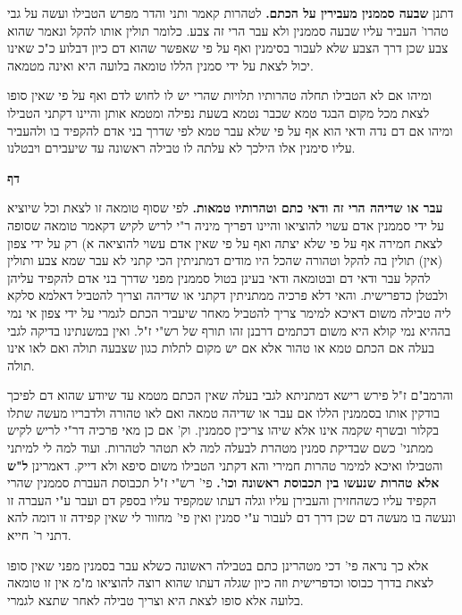 \documentclass[12pt, openany]{book}
\newcommand{\sethebfont}{
\fontsize{10.5pt}{21.0pt} \selectfont
}
\newcommand{\twocol}[1]{
	{\sethebfont \begin{multicols}{2}
			#1
	\end{multicols}}	
}
\newcommand{\textblock}[1]{
{\sethebfont #1\\}	
}
\newcommand{\chapname}{}
\newcommand{\newchap}[1]{
	\addcontentsline{toc}{chapter}{#1}
	\renewcommand{\chapname}{#1}
		\begin{center}
			\textbf{%
\fontsize{16pt}{16pt}\selectfont
				#1}
		\end{center}
}
\begin{document}
{ דתנן \textbf{שבעה סממנין מעבירין על הכתם.}  לטהרות קאמר ותני והדר מפרש הטבילו ועשה על גבי טהרו' העביר עליו שבעה סממנין ולא עבר הרי זה צבע. כלומר תולין אותו להקל ונאמר שהוא צבע שכן דרך הצבע שלא לעבור בסימנין ואף על פי שאפשר שהוא דם כיון דבלוע כ"כ שאינו יכול לצאת על ידי סמנין הללו טומאה בלועה היא ואינה מטמאה.\par ומיהו אם לא הטבילו תחלה טהרותיו תלויות שהרי יש לו לחוש לדם ואף על פי שאין סופו לצאת מכל מקום הבגד טמא שכבר נטמא בשעת נפילה ומטמא אותן והיינו דקתני הטבילו ומיהו אם דם נדה ודאי הוא אף על פי שלא עבר טמא לפי שדרך בני אדם להקפיד בו ולהעביר עליו סימנין אלו הילכך לא עלתה לו טבילה ראשונה עד שיעבירם ויבטלנו. 
\par}
\newchap{דף }
\twocol{\textbf{עבר או שדיהה הרי זה ודאי כתם וטהרותיו טמאות.}  לפי שסוף טומאה זו לצאת וכל שיוציא על ידי סממנין אדם עשוי להוציאו והיינו דפריך מיניה ר"י לריש לקיש דקאמר טומאה שסופה לצאת חמירה אף על פי שלא יצתה ואף על פי שאין אדם עשוי להוציאה א) רק על ידי צפון (אין) תולין בה להקל וטהורה שהכל היו מודים דמתניתין הכי קתני לא עבר שמא צבע ותולין להקל עבר ודאי דם ובטומאה ודאי בעינן בטול סממנין מפני שדרך בני אדם להקפיד עליהן ולבטלן כדפרישית. והאי דלא פרכיה ממתניתין דקתני או שדיהה וצריך להטביל דאלמא סלקא ליה טבילה משום דאיכא למימר צריך להטביל מאחר שיעביר הכתם לגמרי על ידי צפון אי נמי בההיא נמי קולא היא משום דכתמים דרבנן זהו תורף של רש"י ז"ל. ואין במשנתינו בדיקה לגבי בעלה אם הכתם טמא או טהור אלא אם יש מקום לתלות כגון שצבעה תולה ואם לאו אינו תולה.\par והרמב"ם ז"ל פירש רישא דמתניתא לגבי בעלה שאין הכתם מטמא עד שיודע שהוא דם לפיכך בודקין אותו בסממנין הללו אם עבר או שדיהה טמאה ואם לאו טהורה ולדבריו מעשה שתלו בקלור ובשרף שקמה אינו אלא שיהו צריכין סממנין. וק' אם כן מאי פרכיה דר"י לריש לקיש ממתני' כשם שבדיקת סמנין מטהרת לבעלה למה לא תטהר לטהרות. ועוד למה לי למיתני והטבילו ואיכא למימר טהרות חמירי והא דקתני הטבילו משום סיפא ולא דייק. 
\parהא דאמרינן \textbf{ל"ש אלא טהרות שנעשו בין תכבוסת ראשונה וכו'.}  פי' רש"י ז"ל תכבוסת העברת סממנין שהרי הקפיד עליו כשהחזירן והעבירן עליו וגלה דעתו שמקפיד עליו בספק דם ועבר ע"י העברה זו ונעשה בו מעשה דם שכן דרך דם לעבור ע"י סמנין ואין פי' מחוור לי שאין קפידה זו דומה להא דתני ר' חייא.\par  אלא כך נראה פי' דכי מטהרינן כתם בטבילה ראשונה כשלא עבר בסמנין מפני שאין סופו לצאת בדרך כבוסו וכדפרישית וזה כיון שגלה דעתו שהוא רוצה להוציאו מ"מ אין זו טומאה בלועה אלא סופו לצאת היא וצריך טבילה לאחר שתצא לגמרי. 
\par}
\textblock{}{}
\textblock{}{}
\end{document}
